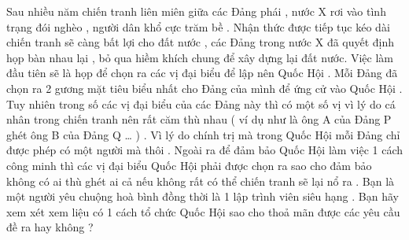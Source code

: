 Sau nhiều năm chiến tranh liên miên giữa các Đảng phái , nước X rơi vào tình trạng đói nghèo , người dân khổ cực trăm bề . Nhận thức được tiếp tục kéo dài chiến tranh sẽ càng bất lợi cho đất nước , các Đảng trong nước X đã quyết định họp bàn nhau lại , bỏ qua hiềm khích chung để xây dựng lại đất nước. Việc làm đầu tiên sẽ là họp để chọn ra các vị đại biểu để lập nên Quốc Hội . Mỗi Đảng đã chọn ra 2 gương mặt tiêu biểu nhất cho Đảng của mình để ứng cử vào Quốc Hội . Tuy nhiên trong số các vị đại biểu của các Đảng này thì có một số vị vì lý do cá nhân trong chiến tranh nên rất căm thù nhau ( ví dụ như là ông A của Đảng P ghét ông B của Đảng Q … ) . Vì lý do chính trị mà trong Quốc Hội mỗi Đảng chỉ được phép có một người mà thôi . Ngoài ra để đảm bảo Quốc Hội làm việc 1 cách công minh thì các vị đại biểu Quốc Hội phải được chọn ra sao cho đảm bảo không có ai thù ghét ai cả nếu không rất có thể chiến tranh sẽ lại nổ ra . Bạn là một người yêu chuộng hoà bình đồng thời là 1 lập trình viên siêu hạng . Bạn hãy xem xét xem liệu có 1 cách tổ chức Quốc Hội sao cho thoả mãn được các yêu cầu đề ra hay không ?